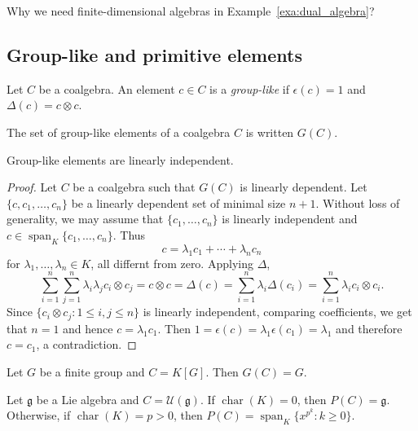\documentclass[12pt]{amsproc}
\begin{document}
Why we need finite-dimensional algebras in Example~\ref{exa:dual_algebra}? 

\subsection{Group-like and primitive elements}

\begin{definition}
    Let $C$ be a coalgebra. An element $c\in C$ is 
    a \emph{group-like} if $\epsilon(c)=1$ and 
    $\Delta(c)=c\otimes c$.  
\end{definition}

The set of group-like elements of a coalgebra $C$ 
is written $G(C)$. 

\begin{proposition}
    Group-like elements are linearly independent. 
\end{proposition}

\begin{proof}
    Let $C$ be a coalgebra such that $G(C)$ is linearly 
    dependent. Let $\{c,c_1,\dots,c_n\}$ be a linearly dependent set of minimal size $n+1$. Without loss of generality, 
    we may assume that 
    $\{c_1,\dots,c_n\}$ is linearly independent and 
    $c\in\operatorname{span}_K\{c_1,\dots,c_n\}$. Thus 
    \[
    c=\lambda_1c_1+\cdots+\lambda_nc_n
    \]
    for $\lambda_1,\dots,\lambda_n\in K$, all differnt from
    zero. 
    Applying $\Delta$, 
    \[
    \sum_{i=1}^{n}\sum_{j=1}^{n}\lambda_i\lambda_jc_i\otimes c_j=c\otimes c=\Delta(c)
    =\sum_{i=1}^{n}\lambda_i\Delta(c_i)
    =\sum_{i=1}^{n}\lambda_ic_i\otimes c_i.
    \]
    Since $\{c_i\otimes c_j:1\leq i,j\leq n\}$ is linearly
    independent, comparing coefficients, we 
    get that $n=1$ and hence $c=\lambda_1c_1$. Then 
    $1=\epsilon(c)=\lambda_1\epsilon(c_1)=\lambda_1$ 
    and therefore $c=c_1$, a contradiction. 
\end{proof}

\begin{example}
    Let $G$ be a finite group and $C=K[G]$. Then 
    $G(C)=G$.  
\end{example}

\begin{definition}
\end{definition}

\begin{example}
    Let $\mathfrak{g}$ be a Lie algebra 
    and $C=\mathcal{U}(\mathfrak{g})$. If $\operatorname{char}(K)=0$, then $P(C)=\mathfrak{g}$. Otherwise, if 
    $\operatorname{char}(K)=p>0$, then 
    $P(C)=\operatorname{span}_K\{x^{p^k}:k\geq0\}$.
\end{example}
\end{document}
